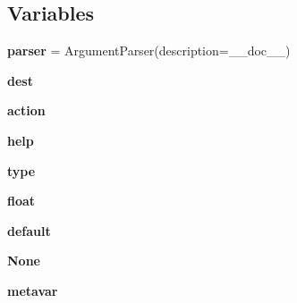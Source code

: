 \subsection*{Variables}
\begin{DoxyCompactItemize}
\item 
\mbox{\label{namespacepymavlink_1_1tools_1_1mavsigloss_adcd655ad86a93f066e9a4adbbc37260a}} 
{\bfseries parser} = Argument\+Parser(description=\+\_\+\+\_\+doc\+\_\+\+\_\+)
\item 
\mbox{\label{namespacepymavlink_1_1tools_1_1mavsigloss_aaeeba6755f80fe768b355a91c496ce51}} 
{\bfseries dest}
\item 
\mbox{\label{namespacepymavlink_1_1tools_1_1mavsigloss_ad5ed1d848b78690512c9985b9b047b59}} 
{\bfseries action}
\item 
\mbox{\label{namespacepymavlink_1_1tools_1_1mavsigloss_a21210a1523365802d073cdafa8107869}} 
{\bfseries help}
\item 
\mbox{\label{namespacepymavlink_1_1tools_1_1mavsigloss_a9683370da882fc72e8d520c009ba10f9}} 
{\bfseries type}
\item 
\mbox{\label{namespacepymavlink_1_1tools_1_1mavsigloss_a580bca440e4e110cd01f2c03a3974ca3}} 
{\bfseries float}
\item 
\mbox{\label{namespacepymavlink_1_1tools_1_1mavsigloss_a1f685e8d620ade3e1cf337b75c589ebc}} 
{\bfseries default}
\item 
\mbox{\label{namespacepymavlink_1_1tools_1_1mavsigloss_ab349e444598f01453f01a7c6220ea5ba}} 
{\bfseries None}
\item 
\mbox{\label{namespacepymavlink_1_1tools_1_1mavsigloss_a7c11ba9cd7194a1ed990689d7333530c}} 
{\bfseries metavar}
\item 
\mbox{\label{namespacepymavlink_1_1tools_1_1mavsigloss_a62a71c95b15ac8435ca4ab32f42fbcc7}} 

\end{DoxyCompactItemize}
